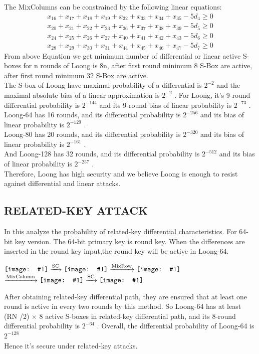 \documentclass[preprint]{transcrypto}
\newcommand{\TeaserImage}[1]{\vcenter{\hbox{\texttt{[image: \#1]}}}}
\begin{document}
The MixColumns can be constrained by the following linear equations:
\begin{gather}
    x_{16}+x_{17}+x_{18}+x_{19}+x_{32}+x_{33}+x_{34}+x_{35}-5d_4\ge0\\
    x_{20}+x_{21}+x_{22}+x_{23}+x_{36}+x_{37}+x_{38}+x_{39}-5d_5\ge0\\
    x_{24}+x_{25}+x_{26}+x_{27}+x_{40}+x_{41}+x_{42}+x_{43}-5d_6\ge0\\
    x_{28}+x_{29}+x_{30}+x_{31}+x_{44}+x_{45}+x_{46}+x_{47}-5d_7\ge0
\end{gather}
From above Equation we get minimum number of differential or linear active S-boxes for n rounds of Loong is 8n, after first round minimum 8 S-Box are active, after first round minimum 32 S-Box are active.\\
The S-box of Loong have maximal probability of a differential is $2^{−2}$ and the maximal absolute bias of a linear approximation
is $2^{−2}$ . For Loong, it's 9-round differential probability is $2^{-144}$ and its 9-round bias of linear probability is $2^{-73}$ .\\
Loong-64 has 16 rounds, and its differential probability is $2^{-256}$
and its bias of linear probability is $2^{-129}$ .\\
Loong-80 has 20 rounds, and its differential probability is $2^{-320}$ and its bias
of linear probability is $2^{-161}$ .\\
And Loong-128 has 32 rounds, and its differential probability is $2^{-512}$ and its bias of linear
probability is $2^{-257}$ .\\ Therefore, Loong has high security and
we believe Loong is enough to resist against differential and
linear attacks.

\subsection{RELATED-KEY ATTACK}
In this analyze the probability of related-key differential characteristics. For 64-bit key version. The 64-bit primary key is round key. When the differences are inserted in the round key input,the round key will be active in Loong-64.
 \begin{center}
      $\TeaserImage{a1b.png} \xrightarrow{\text{SC}} \TeaserImage{a1b.png}
        \xrightarrow{\text{MixRow}} \TeaserImage{3.png} $
        $\xrightarrow{\text{MixColumn}}
        \TeaserImage{a1d.png} \xrightarrow{\text{SC}}\TeaserImage{a1d.png}$
 \end{center}
 After  obtaining related-key differential path, they are
 ensured that at least one round is active in every two rounds
 by this method. So Loong-64 has at least (RN /2) $\times$ 8 active
 S-boxes in related-key differential path, and its 8-round differential probability is $2^{-64}$ . Overall, the differential probability of Loong-64 is $2^{-128}$ \\
 Hence it's secure under related-key attacks.\\
 
\end{document}

